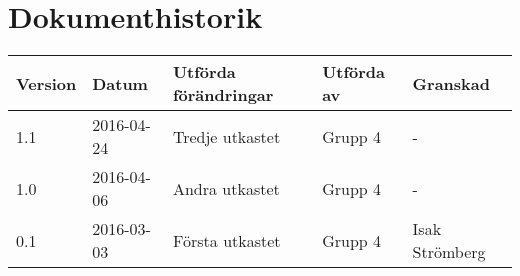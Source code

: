 \documentclass[11pt]{article}
\begin{document}
\tableofcontents

\pagebreak
\section*{Dokumenthistorik}
\begin{table}[h]
\begin{tabular}{|l|l|l|l|l|} \hline

\textbf{Version} & \textbf{Datum} & \textbf{Utförda förändringar} & \textbf{Utförda av} & \textbf{Granskad} \\ \hline
1.1 & 2016-04-24 & Tredje utkastet & Grupp 4 & - \\ \hline
1.0 & 2016-04-06 & Andra utkastet & Grupp 4 & - \\ \hline
0.1 & 2016-03-03 &  Första utkastet & Grupp 4 & Isak Strömberg \\ \hline
\end{tabular}
\end{table}

\pagebreak
{}
\end{document}
